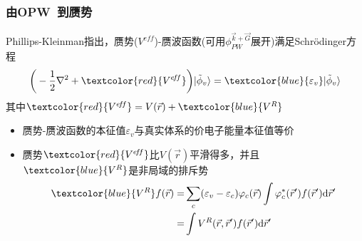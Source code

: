 \frame
{
	\frametitle{由\textrm{OPW~}到赝势}
	\textrm{Phillips-Kleinman}指出，赝势($V^{e\!f\!f}$)-赝波函数(可用$\phi_{PW}^{\vec k+\vec G}$展开)满足\textrm{Schr\"odinger}方程%
	$$\bigg(-\dfrac12\nabla^2+\textcolor{red}{V^{e\!f\!f}}\bigg)|\tilde{\phi}_v\rangle=\textcolor{blue}{\varepsilon_v}|\tilde{\phi}_v\rangle$$
	其中$\textcolor{red}{V^{e\!f\!f}}=V(\vec r)+\textcolor{blue}{V^R}$
	\begin{itemize}
		\item 赝势-赝波函数的本征值$\varepsilon_v$与真实体系的价电子能量本征值等价
		\item 赝势$\textcolor{red}{V^{e\!f\!f}}$比$V(\vec r)$平滑得多，并且$\textcolor{blue}{V^R}$是非局域的排斥势
			\begin{displaymath}
				\begin{aligned}
					\textcolor{blue}{V^R}f(\vec r)=&\sum_c(\varepsilon_v-\varepsilon_c)\varphi_c(\vec r)\int\varphi_c^{\ast}(\vec r^{\prime})f(\vec r^{\prime})\mathrm{d}\vec r^{\prime} \\
					=&\int V^R(\vec r,\vec r^{\prime})f(\vec r^{\prime})\mathrm{d}\vec r^{\prime}
				\end{aligned}
			\end{displaymath}
	\end{itemize}
}

